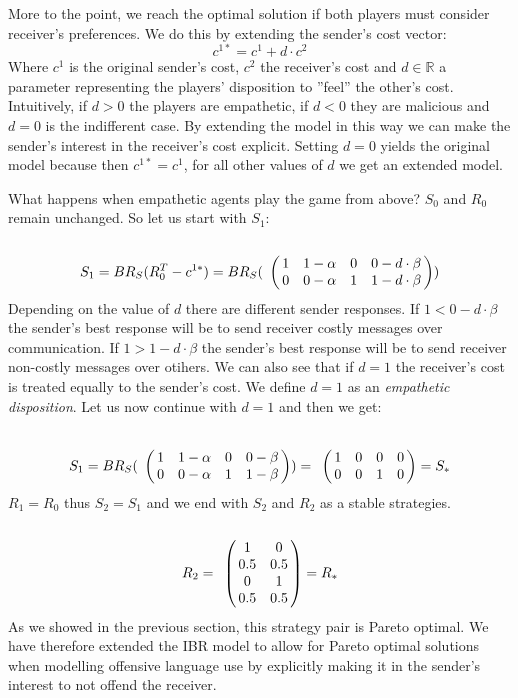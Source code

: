 \documentclass[10pt]{article}
\begin{document}
More to the point, we reach the optimal solution if both players must consider receiver's preferences. We do this by extending the sender's cost vector:
$$c^{1*}=c^{1} + d \cdot c^{2}$$
Where $c^{1}$ is the original sender's cost, $c^{2}$ the receiver's cost and $d \in \mathbb{R}$ a parameter representing the players' disposition to ''feel'' the other's cost. Intuitively, if $d>0$ the players are empathetic, if $d<0$ they are malicious and $d=0$ is the indifferent case. By extending the model in this way we can make the sender's interest in the receiver's cost explicit. Setting $d=0$ yields the original model because then $c^{1*}=c^{1}$, for all other values of $d$ we get an extended model. 

What happens when empathetic agents play the game from above? $S_0$ and $R_0$ remain unchanged. So let us start with $S_1$:
\begin{equation*}
S_1= BR_S(R_0^T-c^{1*})=BR_S(
\bordermatrix{
                & & & &    \cr
     &       1 &         1-\alpha & 0       & 0-d\cdot \beta \cr
     &       0 &         0-\alpha & 1      & 1-d\cdot \beta
 }
)
\end{equation*}
Depending on the value of $d$ there are different sender responses. If $1<0-d\cdot \beta$ the sender's best response will be to send receiver costly messages over communication.  If $1>1-d\cdot \beta$ the sender's best response will be to send receiver non-costly messages over otihers. We can also see that if $d=1$ the receiver's cost is treated equally to the sender's cost. We define $d=1$ as an \textit{empathetic disposition}. Let us now continue with $d=1$ and then we get:

\begin{equation*}
S_1=BR_S(
\bordermatrix{
                & & & &    \cr
     &       1 &         1-\alpha & 0       & 0-\beta \cr
     &       0 &         0-\alpha & 1      & 1-\beta
 }
 )
=
\bordermatrix{
                & & & &    \cr
     &       1 &         0 & 0       & 0 \cr
     &       0 &         0 & 1      & 0
 }
 =S_*
 \end{equation*}
$R_1=R_0$ thus $S_2=S_1$ and we end with $S_2$ and $R_2$ as a stable strategies.
\begin{equation*}
  R_2= \bordermatrix{
              &  & \cr
      & 1 & 0 \cr
       & 0.5 & 0.5 \cr
       & 0 & 1 \cr
       & 0.5 & 0.5 \cr
   }
   =R_*
\end{equation*}
As we showed in the previous section, this strategy pair is Pareto optimal. We have therefore extended the IBR model to allow for Pareto optimal solutions when modelling offensive language use by explicitly making it in the sender's interest to not offend the receiver.
\end{document}
